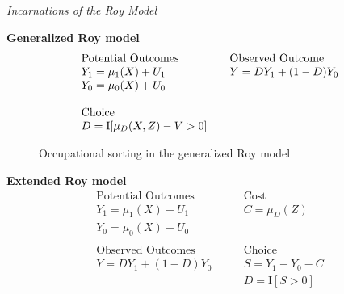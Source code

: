 \begin{frame}\begin{center}
		\LARGE\textit{Incarnations of the Roy Model}
\end{center}\end{frame}
\begin{frame}
	\textbf{Generalized Roy model}
	\begin{align*}\begin{array}{l@{\qquad}l}
			\text{Potential Outcomes} &\text{Observed Outcome}\\
			Y_1 = \mu_1(X) + U_1      &  Y = D Y_1 + (1 - D)Y_0 \\
			Y_0 = \mu_0(X) + U_0      &\\
			& \\
			\text{Choice} & \\
			D = \mathrm{I}[\mu_D(X, Z) - V > 0] & \\
		\end{array}
	\end{align*}
\end{frame}
\begin{frame}
	\begin{figure}[htp]\centering
		\caption{Occupational sorting in the generalized Roy model}
	\end{figure}
\end{frame}
\begin{frame}
	\textbf{Extended Roy model}
	\begin{align*}
	\text{Potential Outcomes} &\qquad \text{Cost} \\
	Y_1 = \mu_1(X) + U_1      &\qquad C = \mu_D(Z) \\
	Y_0 = \mu_0(X) + U_0      &\qquad \\
	& \\
	\text{Observed Outcomes } &\qquad \text{Choice} \\
	Y = D Y_1 + (1 - D)Y_0 &\qquad S = Y_1 - Y_0 - C \\
	&\qquad D = \mathrm{I}[S > 0] \\
	\end{align*}
\end{frame}
